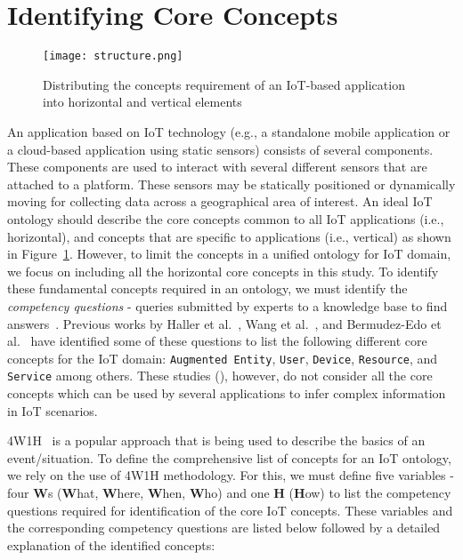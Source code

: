 \documentclass{elsart}  %
\begin{document}
\section{Identifying Core Concepts}\label{sec:requirements}
\begin{figure}
\centering
 \texttt{[image: structure.png]}
 \caption{Distributing the concepts requirement of an IoT-based application into horizontal and vertical elements}
 \label{fig:structureOfOntology}
 \end{figure}
An application based on IoT technology (e.g., a standalone mobile application or a cloud-based application using static sensors) consists of several components. These components are used to interact with several different sensors that are attached to a platform. These sensors may be statically positioned or dynamically moving for collecting data across a geographical area of interest. An ideal IoT ontology should describe the core concepts common to all IoT applications (i.e., horizontal), and concepts that are specific to applications (i.e., vertical) as shown in Figure~\ref{fig:structureOfOntology}. However, to limit the concepts in a unified ontology for IoT domain, we focus on including all the horizontal core concepts in this study. To identify these fundamental concepts required in an ontology, we must identify the \textit{competency questions} - queries submitted by experts to a knowledge base to find answers~\cite{yan2015ontology}. Previous works by Haller et al.~\cite{haller2013domain}, Wang et al.~\cite{wang2013knowledge}, and Bermudez-Edo et al.~\cite{bermudez2016iot,BermudezEdo2017} have identified some of these questions to list the following different core concepts for the IoT domain: \texttt{Augmented Entity}, \texttt{User}, \texttt{Device}, \texttt{Resource}, and \texttt{Service} among others. These studies (\cite{haller2013domain,wang2013knowledge,bermudez2016iot,BermudezEdo2017}), however, do not consider all the core concepts which can be used by several applications to infer complex information in IoT scenarios. 
\par 4W1H~\cite{4w1hDescribing,4w1hcrowdsensing} is a popular approach that is being used to describe the basics of an event/situation. To define the comprehensive list of concepts for an IoT ontology, we rely on the use of 4W1H methodology. For this, we must define five variables - four \textbf{W}s (\textbf{W}hat, \textbf{W}here, \textbf{W}hen, \textbf{W}ho) and one \textbf{H} (\textbf{H}ow) to list the competency questions required for identification of the core IoT concepts. These variables and the corresponding competency questions are listed below followed by a detailed explanation of the identified concepts: 
\end{document}
